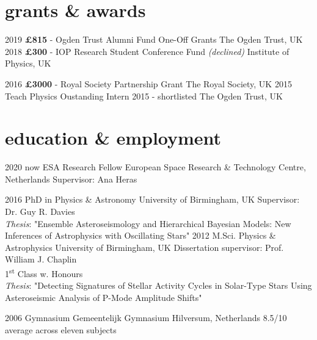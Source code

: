 \documentclass[letterpaper]{k-cv} %
\begin{document}
\section{\color{c4}grants \& awards}

\begin{entrylist}
	\entrythree
	{2019}
	{\textbf{\textcolor{c4}{\pounds 815}} - Ogden Trust Alumni Fund One-Off Grants}
	{The Ogden Trust, UK}
	\entrythree
	{2018}
	{\textbf{\textcolor{c4}{\pounds 300}} - IOP Research Student Conference Fund \emph{(declined)}}
	{Institute of Physics, UK}
	
	\entrythree
	{2016}
	{\textbf{\textcolor{c4}{\pounds 3000}} - Royal Society Partnership Grant}
	{The Royal Society, UK}
	\entrythree
	{2015}
	{Teach Physics Oustanding Intern 2015 - shortlisted}
	{The Ogden Trust, UK}
	
\end{entrylist}



\section{\color{c1}education \& employment}

\begin{entrylist}
\centry
{2020 \to now}
{ESA Research Fellow}
{European Space Research \& Technology Centre, Netherlands}
{Supervisor: Ana Heras}
	
\centry
{2016 }
{PhD {\normalfont in Physics \& Astronomy}}
{University of Birmingham, UK}
{Supervisor: Dr. Guy R. Davies\\
\textit{Thesis}: "Ensemble Asteroseismology and Hierarchical Bayesian Models: New Inferences of Astrophysics with Oscillating Stars"} 
\centry
{2012 }
{M.Sci. {\normalfont Physics \& Astrophysics}}
{University of Birmingham, UK}
{Dissertation supervisor: Prof. William J. Chaplin\\
1\textsuperscript{st} Class w. Honours\\ \textit{Thesis}: "Detecting Signatures of Stellar Activity Cycles in Solar-Type Stars Using Asteroseismic Analysis of P-Mode Amplitude Shifts"}



\centry
{2006 }
{Gymnasium}
{Gemeentelijk Gymnasium Hilversum, Netherlands}
{8.5/10 average across eleven subjects}
\end{entrylist}
\end{document}
